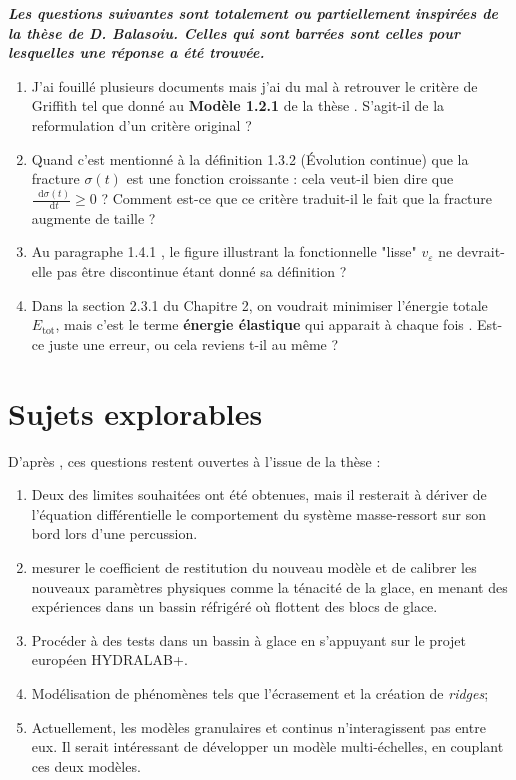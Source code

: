 \documentclass[
  french,
	11pt, %
]{fphw}
\newcommand*\diff{\mathop{}\!\mathrm{d}}
\begin{document}
\textbf{\textit{Les questions suivantes sont totalement ou partiellement inspirées de la thèse de D. Balasoiu. Celles qui sont barrées sont celles pour lesquelles une réponse a été trouvée.}}
\begin{enumerate}
  \item J'ai fouillé plusieurs documents mais j'ai du mal à retrouver le critère de Griffith tel que donné au \textbf{Modèle 1.2.1} de la thèse \parencite[p.32]{balasoiu2020thesis}. S'agit-il de la reformulation d'un critère original ?
  \item Quand c'est mentionné à la définition 1.3.2 (Évolution continue) \parencite[p.37]{balasoiu2020thesis} que la fracture $\sigma(t)$ est une fonction croissante : cela veut-il bien dire que $\frac{\diff{\sigma (t)}}{\diff{t}} \geq 0$ ? Comment est-ce que ce critère traduit-il le fait que la fracture augmente de taille ?
  \item Au paragraphe 1.4.1 \parencite[p.37]{balasoiu2020thesis}, le figure illustrant la fonctionnelle "lisse" $v_{\varepsilon}$ ne devrait-elle pas être discontinue étant donné sa définition ?
  \item Dans la section 2.3.1 du Chapitre 2, on voudrait minimiser l'énergie totale $E_{\text{tot}}$, mais c'est le terme \textbf{énergie élastique} qui apparait à chaque fois \parencite[p.49]{balasoiu2020thesis}. Est-ce juste une erreur, ou cela reviens t-il au même ?
\end{enumerate}


\section{Sujets explorables}

D'après \parencite{balasoiu2020thesis}, ces questions restent ouvertes à l'issue de la thèse :
\begin{enumerate}
  \item Deux des limites souhaitées ont été obtenues, mais il resterait à dériver de l’équation différentielle le comportement du système masse-ressort sur son bord lors d’une percussion.
  \item mesurer le coefficient de restitution du nouveau modèle et de calibrer les nouveaux paramètres physiques comme
  la ténacité de la glace, en menant des expériences dans un bassin réfrigéré où flottent des blocs de glace.
  \item Procéder à des tests dans un bassin à glace en s’appuyant sur le projet européen HYDRALAB+.
  \item Modélisation de phénomènes tels que l’écrasement et la création de \textit{ridges};
  \item Actuellement, les modèles granulaires et continus n’interagissent pas
  entre eux. Il serait intéressant de développer un modèle multi-échelles, en couplant ces deux modèles.
  
\end{enumerate}

\clearpage   %
\printbibliography
\end{document}
